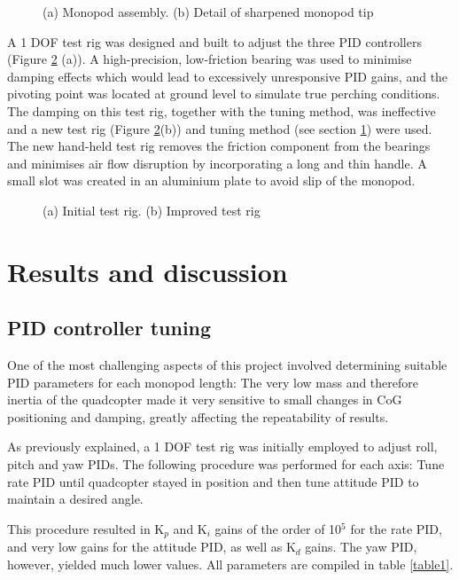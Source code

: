 \documentclass[12pt,a4paper]{article}
\begin{document}
\begin{figure}[h!]
\centering
  \caption{(a) Monopod assembly. (b) Detail of sharpened monopod tip}
  \label{fig5}
\end{figure}

A 1 DOF test rig was designed and built to adjust the three PID controllers (Figure \ref{fig6} (a)). A high-precision, low-friction bearing was used to minimise damping effects which would lead to excessively unresponsive PID gains, and the pivoting point was located at ground level to simulate true perching conditions. The damping on this test rig, together with the tuning method, was ineffective and a new test rig (Figure \ref{fig6}(b)) and tuning method (see section \ref{Results and discussion}) were used. The new hand-held test rig removes the friction component from the bearings and minimises air flow disruption by incorporating a long and thin handle. A small slot was created in an aluminium plate to avoid slip of the monopod.


\begin{figure}[h!]
\centering
  \caption{(a) Initial test rig. (b) Improved test rig}
  \label{fig6}
\end{figure}

\section{Results and discussion} \label{Results and discussion}
\subsection{PID controller tuning}
One of the most challenging aspects of this project involved determining suitable PID parameters for each monopod length: The very low mass and therefore inertia of the quadcopter made it very sensitive to small changes in CoG positioning and damping, greatly affecting the repeatability of results.

As previously explained, a 1 DOF test rig was initially employed to adjust roll, pitch and yaw PIDs. The following procedure was performed for each axis: Tune rate PID until quadcopter stayed in position and then tune attitude PID to maintain a desired angle. 

This procedure resulted in K$_p$ and K$_i$ gains of the order of 10$^5$ for the rate PID, and very low gains for the attitude PID, as well as K$_d$ gains. The yaw PID, however, yielded much lower values. All parameters are compiled in table \ref{table1}. 
\end{document}
